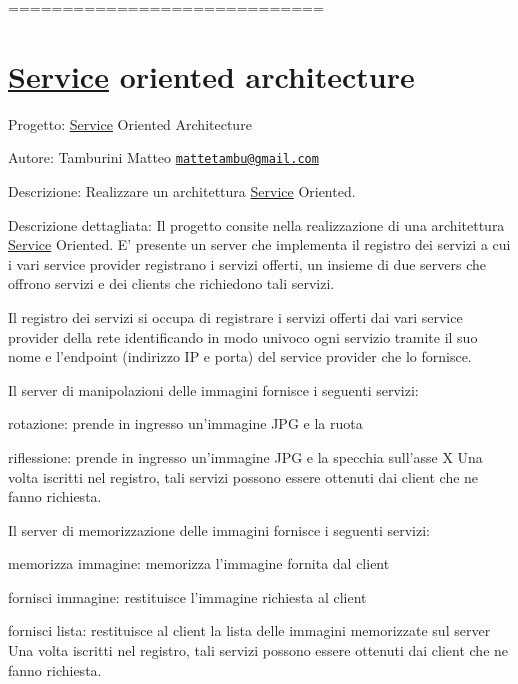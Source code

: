 ============================= \section*{\hyperlink{class_service}{Service} oriented architecture}

Progetto\-: \hyperlink{class_service}{Service} Oriented Architecture

Autore\-: Tamburini Matteo \href{mailto:mattetambu@gmail.com}{\tt mattetambu@gmail.\-com}

Descrizione\-: Realizzare un architettura \hyperlink{class_service}{Service} Oriented.

Descrizione dettagliata\-: Il progetto consite nella realizzazione di una architettura \hyperlink{class_service}{Service} Oriented. E' presente un server che implementa il registro dei servizi a cui i vari service provider registrano i servizi offerti, un insieme di due servers che offrono servizi e dei clients che richiedono tali servizi.

Il registro dei servizi si occupa di registrare i servizi offerti dai vari service provider della rete identificando in modo univoco ogni servizio tramite il suo nome e l'endpoint (indirizzo I\-P e porta) del service provider che lo fornisce.

Il server di manipolazioni delle immagini fornisce i seguenti servizi\-:
\begin{DoxyItemize}
\item rotazione\-: prende in ingresso un'immagine J\-P\-G e la ruota
\item riflessione\-: prende in ingresso un'immagine J\-P\-G e la specchia sull'asse X Una volta iscritti nel registro, tali servizi possono essere ottenuti dai client che ne fanno richiesta.
\end{DoxyItemize}

Il server di memorizzazione delle immagini fornisce i seguenti servizi\-:
\begin{DoxyItemize}
\item memorizza immagine\-: memorizza l'immagine fornita dal client
\item fornisci immagine\-: restituisce l’immagine richiesta al client
\item fornisci lista\-: restituisce al client la lista delle immagini memorizzate sul server Una volta iscritti nel registro, tali servizi possono essere ottenuti dai client che ne fanno richiesta.
\end{DoxyItemize}

